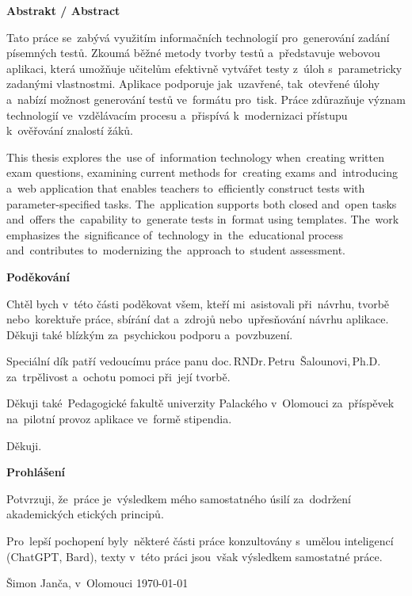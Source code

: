 \documentclass[11pt,a4paper]{report}
\newenvironment{singletonpage}[1]{
    \thispagestyle{empty} %
    \setlength{\parskip}{10pt} %
    \setlength{\parindent}{0pt}
    \vspace*{\stretch{1}} %
    \begin{center}      %
        \textbf{\Huge #1}\\[.4cm]
    \end{center}
}{
    \vspace*{\stretch{3}} %
    \clearpage          %
}
\begin{document}
    \begin{singletonpage}{Abstrakt / Abstract}
    
        Tato práce se~zabývá využitím informačních technologií pro~generování zadání písemných testů. Zkoumá běžné metody tvorby testů a~představuje webovou aplikaci, která umožňuje učitelům efektivně vytvářet testy z~úloh s~parametricky zadanými vlastnostmi. Aplikace podporuje jak~uzavřené, tak~otevřené úlohy a~nabízí možnost generování testů ve~formátu pro~tisk. Práce zdůrazňuje význam technologií ve~vzdělávacím procesu a~přispívá k~modernizaci přístupu k~ověřování znalostí žáků.

        This thesis explores the~use of~information technology when~creating written exam questions, examining current methods for~creating exams and~introducing a~web application that enables teachers to~efficiently construct tests with parameter-specified tasks. The~application supports both closed and~open tasks and~offers the~capability to~generate tests in~format using templates. The~work emphasizes the~significance of~technology in~the~educational process and~contributes to~modernizing the~approach to~student assessment.
    \end{singletonpage}

    \begin{singletonpage}{Poděkování}
    
        Chtěl bych v~této části poděkovat všem, kteří mi~asistovali při~návrhu, tvorbě nebo~korektuře práce, sbírání dat a~zdrojů nebo~upřesňování návrhu aplikace. Děkuji také blízkým za~psychickou podporu a~povzbuzení.
        
        Speciální dík patří vedoucímu práce panu {doc.\,RNDr.\,Petru~Šalounovi,\,Ph.D.} za~trpělivost a~ochotu pomoci při~její tvorbě.
        
        Děkuji také~Pedagogické fakultě univerzity Palackého v~Olomouci za~příspěvek na~pilotní provoz aplikace ve~formě stipendia.

        Děkuji.
    \end{singletonpage}
    
    \begin{singletonpage}{Prohlášení}
    
        Potvrzuji, že~práce je~výsledkem mého samostatného úsilí za~dodržení akademických etických principů.
        
        Pro~lepší pochopení byly~některé části práce konzultovány s~umělou inteligencí (ChatGPT, Bard), texty v~této práci jsou~však výsledkem samostatné práce.

        Šimon Janča, v~Olomouci \today
    \end{singletonpage}
    
\end{document}
